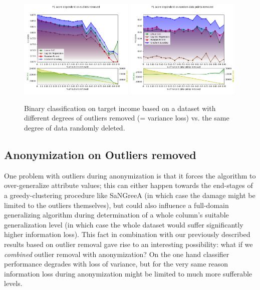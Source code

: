 \documentclass{llncs}
\begin{document}
\begin{figure}[!h]
	\centering
	\includegraphics[width=0.49\textwidth]{figures/outliers/outliers_removed_all_algos_std_blur_bright}
	\includegraphics[width=0.49\textwidth]{figures/outliers/randomly_removed_points_all_algos_std_blur_bright}
	\caption{Binary classification on target income based on a dataset with different degrees of outliers removed (= variance loss) vs. the same degree of data randomly deleted.}
	\label{fig:results_outliers_removed}
\end{figure}



\subsection{Anonymization on Outliers removed}
\label{ssect:anon_outliers_removed}

One problem with outliers during anonymization is that it forces the algorithm to over-generalize attribute values; this can either happen towards the end-stages of a greedy-clustering procedure like SaNGreeA (in which case the damage might be limited to the outliers themselves), but could also influence a full-domain generalizing algorithm during determination of a whole column's suitable generalization level (in which case the whole dataset would suffer significantly higher information loss). This fact in combination with our previously described results based on outlier removal gave rise to an interesting possibility: what if we \textit{combined} outlier removal with anonymization? On the one hand classifier performance degrades with loss of variance, but for the very same reason information loss during anonymization might be limited to much more sufferable levels.
\end{document}
